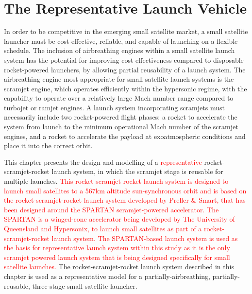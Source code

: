 
\cleardoublepage
\chapter{The Representative Launch Vehicle}\label{chapter:Design}



In order to be competitive in the emerging small satellite market, a small satellite launcher must be cost-effective, reliable, and capable of launching on a flexible schedule. The inclusion of airbreathing engines within a small satellite launch system has the potential for improving cost effectiveness compared to disposable rocket-powered launchers, by allowing partial reusability of a launch system. The airbreathing engine most appropriate for small satellite launch systems is the scramjet engine, which operates efficiently within the hypersonic regime, with the capability to operate over a relatively large Mach number range compared to turbojet or ramjet engines. A launch system incorporating scramjets must necessarily include two rocket-powered flight phases: a rocket to accelerate the system from launch to the minimum operational Mach number of the scramjet engines, and a rocket to accelerate the payload at exoatmospheric conditions and place it into the correct orbit. 


This chapter presents the design and modelling of a \textcolor{red}{representative} rocket-scramjet-rocket launch system, in which the scramjet stage is reusable for multiple launches. 
\textcolor{red}{
This rocket-scramjet-rocket launch system is designed to launch small satellites to a 567km altitude sun-synchronous orbit and is based on the rocket-scramjet-rocket launch system developed by Preller \& Smart\cite{Preller2017b}, that has been designed around the SPARTAN scramjet-powered accelerator\cite{Preller2017b}. The SPARTAN is a winged-cone accelerator being developed by The University of Queensland and Hypersonix, to launch small satellites as part of a rocket-scramjet-rocket launch system.
The SPARTAN-based launch system is used as the basis for representative launch system within this study as it is the only scramjet powered launch system that is being designed specifically for small satellite launches. }  
The rocket-scramjet-rocket launch system described in this chapter is used as a representative model for a partially-airbreathing, partially-reusable, three-stage small satellite launcher. 




